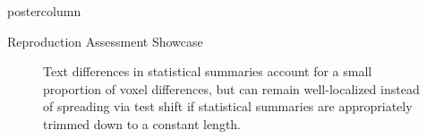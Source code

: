 \begin{frame}
\begin{columns}
\begin{column}{.59\textwidth}
\begin{beamercolorbox}[center]{postercolumn}
\begin{minipage}{.98\textwidth}
{\begin{myblock}{Reproduction Assessment Showcase}
\begin{minipage}{.38\textwidth}
\begin{figure}
							\vspace{0.5em}
							\caption{
								Text differences in statistical summaries account for a small proportion of voxel differences, but can remain well-localized instead of spreading via test shift if statistical summaries are appropriately trimmed down to a constant length.
							}
						\end{figure}
						\begin{figure}

\end{figure}
\end{minipage}
\end{myblock}}
\end{minipage}
\end{beamercolorbox}
\end{column}
\end{columns}
\end{frame}
